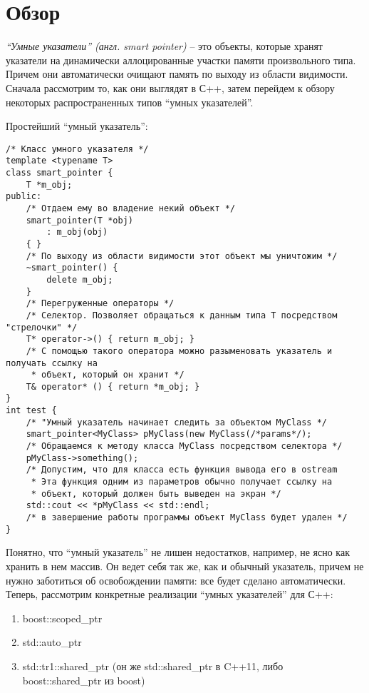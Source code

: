 \section{Обзор}

\textit{``Умные указатели'' (англ. smart pointer)} -- это объекты, которые хранят указатели на динамически аллоцированные участки памяти произвольного типа. Причем они автоматически очищают память по выходу из области видимости.
Сначала рассмотрим то, как они выглядят в С++, затем перейдем к обзору некоторых распространенных типов ``умных указателей''.

Простейший ``умный указатель'':
\begin{lstlisting}
/* Класс умного указателя */
template <typename T>
class smart_pointer {
    T *m_obj;
public:
    /* Отдаем ему во владение некий объект */
    smart_pointer(T *obj)
        : m_obj(obj)
    { }
    /* По выходу из области видимости этот объект мы уничтожим */
    ~smart_pointer() {
        delete m_obj;
    }
    /* Перегруженные операторы */
    /* Селектор. Позволяет обращаться к данным типа T посредством "стрелочки" */
    T* operator->() { return m_obj; }
    /* С помощью такого оператора можно разыменовать указатель и получать ссылку на
     * объект, который он хранит */
    T& operator* () { return *m_obj; }
}
int test {
    /* "Умный указатель начинает следить за объектом MyClass */
    smart_pointer<MyClass> pMyClass(new MyClass(/*params*/);    
    /* Обращаемся к методу класса MyClass посредством селектора */
    pMyClass->something();    
    /* Допустим, что для класса есть функция вывода его в ostream
     * Эта функция одним из параметров обычно получает ссылку на 
     * объект, который должен быть выведен на экран */
    std::cout << *pMyClass << std::endl;    
    /* в завершение работы программы объект MyClass будет удален */
}

\end{lstlisting}

Понятно, что ``умный указатель'' не лишен недостатков, например, не ясно как хранить в нем массив. Он ведет себя так же, как и обычный указатель, причем не нужно заботиться об освобождении памяти: все будет сделано автоматически.
Теперь, рассмотрим конкретные реализации ``умных указателей'' для С++:

\begin{enumerate}
\item boost::scoped\_ptr
\item std::auto\_ptr
\item std::tr1::shared\_ptr (он же std::shared\_ptr в C++11, либо boost::shared\_ptr из boost)
\end {enumerate}

